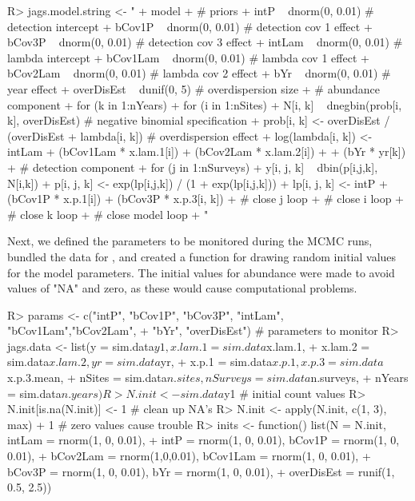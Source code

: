 \documentclass[article]{jss}
\begin{document}
\begin{Code}
R> jags.model.string <- "
+    model {
+    # priors
+    intP ~ dnorm(0, 0.01)       # detection intercept
+    bCov1P ~ dnorm(0, 0.01)     # detection cov 1 effect
+    bCov3P ~ dnorm(0, 0.01)     # detection cov 3 effect
+    intLam ~ dnorm(0, 0.01)     # lambda intercept
+    bCov1Lam ~ dnorm(0, 0.01)   # lambda cov 1 effect
+    bCov2Lam ~ dnorm(0, 0.01)   # lambda cov 2 effect
+    bYr ~ dnorm(0, 0.01)        # year effect
+    overDisEst ~ dunif(0, 5)    # overdispersion size
+    # abundance component
+    for (k in 1:nYears){
+      for (i in 1:nSites){
+        N[i, k] ~ dnegbin(prob[i, k], overDisEst) # negative binomial specification
+        prob[i, k] <- overDisEst / (overDisEst + lambda[i, k]) # overdispersion effect
+        log(lambda[i, k]) <- intLam + (bCov1Lam * x.lam.1[i]) + (bCov2Lam * x.lam.2[i]) +
+                          (bYr * yr[k])
+    # detection component
+        for (j in 1:nSurveys){
+          y[i, j, k] ~ dbin(p[i,j,k], N[i,k])
+          p[i, j, k] <- exp(lp[i,j,k]) / (1 + exp(lp[i,j,k]))
+          lp[i, j, k] <- intP + (bCov1P * x.p.1[i]) + (bCov3P * x.p.3[i, k])
+        } # close j loop
+      } # close i loop
+    } # close k loop
+  } # close model loop
+  "
\end{Code}

Next, we defined the parameters to be monitored during the MCMC runs, bundled the data for , and created a function for drawing random initial values for the model parameters.  The initial values for abundance were made to avoid values of "NA" and zero, as these would cause computational problems.

\begin{Code}

R> params <- c("intP", "bCov1P", "bCov3P", "intLam", "bCov1Lam","bCov2Lam",
+              "bYr", "overDisEst") # parameters to monitor
R> jags.data <- list(y = sim.data$y1, x.lam.1 = sim.data$x.lam.1,
+               x.lam.2 = sim.data$x.lam.2, yr = sim.data$yr,
+               x.p.1 = sim.data$x.p.1, x.p.3 = sim.data$x.p.3.mean,
+               nSites = sim.data$n.sites, nSurveys = sim.data$n.surveys,
+               nYears = sim.data$n.years)
R> N.init <- sim.data$y1 # initial count values
R> N.init[is.na(N.init)] <- 1 # clean up NA's
R> N.init <- apply(N.init, c(1, 3), max) + 1 # zero values cause trouble
R> inits <- function() list(N = N.init, intLam = rnorm(1, 0, 0.01),
+                      intP = rnorm(1, 0, 0.01), bCov1P = rnorm(1, 0, 0.01),
+                      bCov2Lam = rnorm(1,0,0.01), bCov1Lam = rnorm(1, 0, 0.01),
+                      bCov3P = rnorm(1, 0, 0.01), bYr = rnorm(1, 0, 0.01),
+                      overDisEst = runif(1, 0.5, 2.5))
\end{Code}
\end{document}
